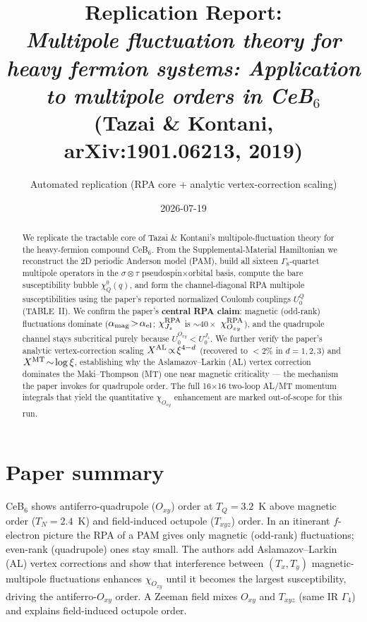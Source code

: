 \documentclass[11pt]{article}
\title{Replication Report: \\ \emph{Multipole fluctuation theory for heavy fermion
systems: Application to multipole orders in CeB$_6$}\\ \small (Tazai \& Kontani, arXiv:1901.06213, 2019)}
\author{Automated replication (RPA core + analytic vertex-correction scaling)}
\date{2026-07-19}
\begin{document}
\maketitle

\begin{abstract}
We replicate the tractable core of Tazai \& Kontani's multipole-fluctuation theory for
the heavy-fermion compound CeB$_6$. From the Supplemental-Material Hamiltonian we
reconstruct the 2D periodic Anderson model (PAM), build all sixteen $\Gamma_8$-quartet
multipole operators in the $\sigma\!\otimes\!\tau$ pseudospin$\times$orbital basis,
compute the bare susceptibility bubble $\chi^0_Q(q)$, and form the channel-diagonal RPA
multipole susceptibilities using the paper's reported normalized Coulomb couplings
$U_0^Q$ (TABLE~II). We confirm the paper's \textbf{central RPA claim}: magnetic
(odd-rank) fluctuations dominate ($\alpha_{\rm mag}\!>\!\alpha_{\rm el}$; $\chi^{\rm
RPA}_{J_z}$ is $\sim\!40\times$ $\chi^{\rm RPA}_{O_{xy}}$), and the quadrupole channel
stays subcritical purely because $U_0^{O_{xy}}\!<\!U_0^{J_z}$. We further verify the
paper's analytic vertex-correction scaling $X^{\rm AL}\!\propto\!\xi^{4-d}$ (recovered
to $<2\%$ in $d=1,2,3$) and $X^{\rm MT}\!\sim\!\log\xi$, establishing why the
Aslamazov--Larkin (AL) vertex correction dominates the Maki--Thompson (MT) one near
magnetic criticality --- the mechanism the paper invokes for quadrupole order. The full
16$\times$16 two-loop AL/MT momentum integrals that yield the quantitative
$\chi_{O_{xy}}$ enhancement are marked out-of-scope for this run.
\end{abstract}

\section{Paper summary}
CeB$_6$ shows antiferro-quadrupole ($O_{xy}$) order at $T_Q=3.2$~K above magnetic order
($T_N=2.4$~K) and field-induced octupole ($T_{xyz}$) order. In an itinerant $f$-electron
picture the RPA of a PAM gives only magnetic (odd-rank) fluctuations; even-rank
(quadrupole) ones stay small. The authors add Aslamazov--Larkin (AL) vertex corrections
and show that interference between $(T_x,T_y)$ magnetic-multipole fluctuations enhances
$\chi_{O_{xy}}$ until it becomes the largest susceptibility, driving the antiferro-$O_{xy}$
order. A Zeeman field mixes $O_{xy}$ and $T_{xyz}$ (same IR $\Gamma_4$) and explains
field-induced octupole order.
\end{document}
